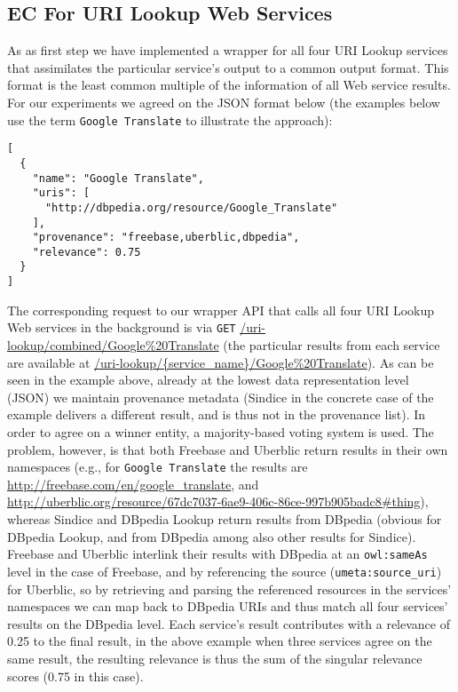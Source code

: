 \documentclass{acm_proc_article-sp}
\begin{document}
\subsection{EC For URI Lookup Web Services}\label{sec:consolidation1}
As as first step we have implemented a wrapper for all four URI Lookup services that assimilates the particular service's output to a common output format. This format is the least common multiple of the information of all Web service results. For our experiments we agreed on the JSON format below (the examples below use the term \texttt{Google Translate} to illustrate the approach):
\begin{verbatim}
[
  {
    "name": "Google Translate",
    "uris": [
      "http://dbpedia.org/resource/Google_Translate"
    ],
    "provenance": "freebase,uberblic,dbpedia",
    "relevance": 0.75
  }
]
\end{verbatim} 
The corresponding request to our wrapper API that calls all four URI Lookup Web services in the background is via \texttt{GET} \url{/uri-lookup/combined/Google%20Translate} (the particular results from each service are available at \url{/uri-lookup/{service_name}/Google%
\end{document}
